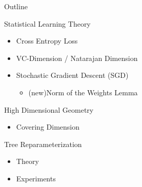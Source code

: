 \newcommand{\new}{(new)}

\begin{frame}{Outline}

Statistical Learning Theory
\begin{itemize}
    \item Cross Entropy Loss
    \item VC-Dimension / Natarajan Dimension
    \item Stochastic Gradient Descent (SGD)
    \begin{itemize}
        \item \new Norm of the Weights Lemma
    \end{itemize}
         
\end{itemize}

High Dimensional Geometry
\begin{itemize}
    \item Covering Dimension
\end{itemize}

Tree Reparameterization
\begin{itemize}
    \item Theory
    \item Experiments
\end{itemize}

\end{frame}


